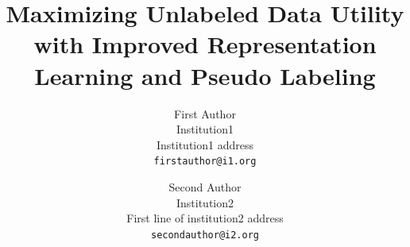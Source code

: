 \documentclass[10pt,twocolumn,letterpaper]{article}
\title{Maximizing Unlabeled Data Utility with Improved Representation Learning and Pseudo Labeling}
\author{First Author\\
Institution1\\
Institution1 address\\
{\tt\small firstauthor@i1.org}
\and
Second Author\\
Institution2\\
First line of institution2 address\\
{\tt\small secondauthor@i2.org}
}
\begin{document}
\maketitle
    







{
    \small
    
    
}

% 
\end{document}
